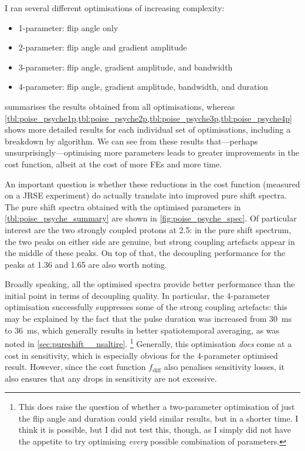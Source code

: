 I ran several different optimisations of increasing complexity:
\begin{itemize}
    \item 1-parameter: flip angle only
    \item 2-parameter: flip angle and gradient amplitude
    \item 3-parameter: flip angle, gradient amplitude, and bandwidth
    \item 4-parameter: flip angle, gradient amplitude, bandwidth, and duration
\end{itemize}

 summarises the results obtained from all optimisations, whereas \cref{tbl:poise_psyche1p,tbl:poise_psyche2p,tbl:poise_psyche3p,tbl:poise_psyche4p} shows more detailed results for each individual set of optimisations, including a breakdown by algorithm.
We can see from these results that---perhaps unsurprisingly---optimising more parameters leads to greater improvements in the cost function, albeit at the cost of more FEs and more time.

An important question is whether these reductions in the cost function (measured on a JRSE experiment) do actually translate into improved pure shift spectra.
The pure shift spectra obtained with the optimised parameters in \cref{tbl:poise_psyche_summary} are shown in \cref{fig:poise_psyche_spec}.
Of particular interest are the two strongly coupled protons at \qty{2.5}{\ppm}: in the pure shift spectrum, the two peaks on either side are genuine, but strong coupling artefacts appear in the middle of these peaks.
On top of that, the decoupling performance for the peaks at \qty{1.36}{\ppm} and \qty{1.65}{\ppm} are also worth noting.

Broadly speaking, all the optimised spectra provide better performance than the initial point in terms of decoupling quality.
In particular, the 4-parameter optimisation successfully suppresses some of the strong coupling artefacts: this may be explained by the fact that the pulse duration was increased from \qty{30}{\ms} to \qty{36}{\ms}, which generally results in better spatiotemporal averaging, as was noted in \cref{sec:pureshift__nsaltire}.%
\footnote{This does raise the question of whether a two-parameter optimisation of just the flip angle and duration could yield similar results, but in a shorter time. I think it is possible, but I did not test this, though, as I simply did not have the appetite to try optimising \textit{every} possible combination of parameters.}
Generally, this optimisation \textit{does} come at a cost in sensitivity, which is especially obvious for the 4-parameter optimised result.
However, since the cost function $f_\text{diff}$ also penalises sensitivity losses, it also ensures that any drops in sensitivity are not excessive.

